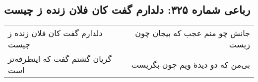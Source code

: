 \begin{center}
\section*{رباعی شماره ۳۲۵: دلدارم گفت کان فلان زنده ز چیست}
\label{sec:0325}
\begin{longtable}{l p{0.5cm} r}
دلدارم گفت کان فلان زنده ز چیست
&&
جانش چو منم عجب که بیجان چون زیست
\\
گریان گشتم گفت که اینطرفه‌تر است
&&
بی‌من که دو دیدهٔ ویم چون بگریست
\\
\end{longtable}
\end{center}
